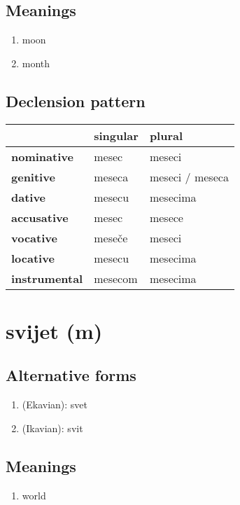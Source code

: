 \subsection*{Meanings}
\begin{enumerate}
\item moon
\item month
\end{enumerate}
\subsection*{Declension pattern}
\begin{tabularx}{\linewidth}{Xll}
\toprule
{} & singular &           plural \\
\midrule
\textbf{nominative  } &    mesec &           meseci \\
\textbf{genitive    } &   meseca &  meseci / meseca \\
\textbf{dative      } &   mesecu &         mesecima \\
\textbf{accusative  } &    mesec &           mesece \\
\textbf{vocative    } &   meseče &           meseci \\
\textbf{locative    } &   mesecu &         mesecima \\
\textbf{instrumental} &  mesecom &         mesecima \\
\bottomrule
\end{tabularx}

\filbreak
\section{svijet (m)}
\subsection*{Alternative forms}
\begin{enumerate}
\item (Ekavian): svet
\item (Ikavian): svit
\end{enumerate}
\subsection*{Meanings}
\begin{enumerate}
\item world
\end{enumerate}
